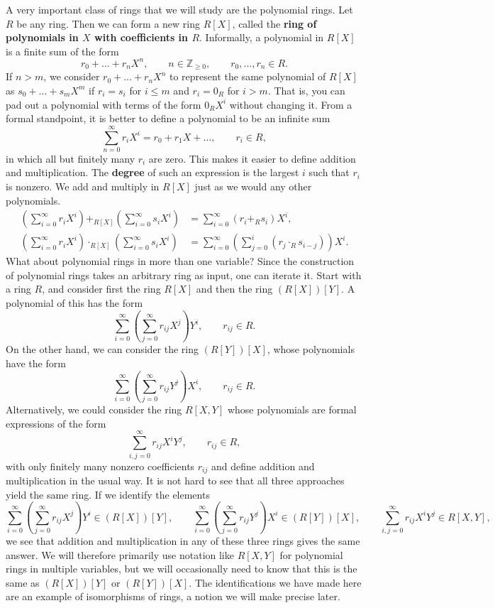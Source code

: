 \documentclass{article}
\newcommand{\Z}{\mathbb{Z}}
\newcommand{\rb}[1]{\left( #1 \right)}
\renewcommand{\sb}[1]{\left[ #1 \right]}
\theoremstyle{definition}\newtheorem{definition}{Definition}[subsection]
\theoremstyle{definition}\newtheorem{remark}[definition]{Remark}
\theoremstyle{definition}\newtheorem*{example}{Example}
\theoremstyle{definition}\newtheorem*{note}{Note}
\begin{document}
A very important class of rings that we will study are the polynomial rings. Let $ R $ be any ring. Then we can form a new ring $ R\sb{X} $, called the \textbf{ring of polynomials in $ X $ with coefficients in $ R $}. Informally, a polynomial in $ R\sb{X} $ is a finite sum of the form
$$ r_0 + \dots + r_nX^n, \qquad n \in \Z_{\ge 0}, \qquad r_0, \dots, r_n \in R. $$
If $ n > m $, we consider $ r_0 + \dots + r_nX^n $ to represent the same polynomial of $ R\sb{X} $ as $ s_0 + \dots + s_mX^m $ if $ r_i = s_i $ for $ i \le m $ and $ r_i = 0_R $ for $ i > m $. That is, you can pad out a polynomial with terms of the form $ 0_RX^i $ without changing it. From a formal standpoint, it is better to define a polynomial to be an infinite sum
$$ \sum_{n = 0}^\infty r_iX^i = r_0 + r_1X + \dots, \qquad r_i \in R, $$
in which all but finitely many $ r_i $ are zero. This makes it easier to define addition and multiplication. The \textbf{degree} of such an expression is the largest $ i $ such that $ r_i $ is nonzero. We add and multiply in $ R\sb{X} $ just as we would any other polynomials.
\begin{align*}
\rb{\sum_{i = 0}^\infty r_iX^i} +_{R\sb{X}} \rb{\sum_{i = 0}^\infty s_iX^i} & = \sum_{i = 0}^\infty \rb{r_i +_R s_i} X^i, \\
\rb{\sum_{i = 0}^\infty r_iX^i} \cdot_{R\sb{X}} \rb{\sum_{i = 0}^\infty s_iX^i} & = \sum_{i = 0}^\infty \rb{\sum_{j = 0}^i \rb{r_j \cdot_R s_{i - j}}} X^i.
\end{align*}
What about polynomial rings in more than one variable? Since the construction of polynomial rings takes an arbitrary ring as input, one can iterate it. Start with a ring $ R $, and consider first the ring $ R\sb{X} $ and then the ring $ \rb{R\sb{X}}\sb{Y} $. A polynomial of this has the form
$$ \sum_{i = 0}^\infty \rb{\sum_{j = 0}^\infty r_{ij}X^j}Y^i, \qquad r_{ij} \in R. $$
On the other hand, we can consider the ring $ \rb{R\sb{Y}}\sb{X} $, whose polynomials have the form
$$ \sum_{i = 0}^\infty \rb{\sum_{j = 0}^\infty r_{ij}Y^j}X^i, \qquad r_{ij} \in R. $$
Alternatively, we could consider the ring $ R\sb{X, Y} $ whose polynomials are formal expressions of the form
$$ \sum_{i, j = 0}^\infty r_{ij}X^iY^j, \qquad r_{ij} \in R, $$
with only finitely many nonzero coefficients $ r_{ij} $ and define addition and multiplication in the usual way. It is not hard to see that all three approaches yield the same ring. If we identify the elements
$$ \sum_{i = 0}^\infty \rb{\sum_{j = 0}^\infty r_{ij}X^j}Y^i \in \rb{R\sb{X}}\sb{Y}, \qquad \sum_{i = 0}^\infty \rb{\sum_{j = 0}^\infty r_{ij}Y^j}X^i \in \rb{R\sb{Y}}\sb{X}, \qquad \sum_{i, j = 0}^\infty r_{ij}X^iY^j \in R\sb{X, Y}, $$
we see that addition and multiplication in any of these three rings gives the same answer. We will therefore primarily use notation like $ R\sb{X, Y} $ for polynomial rings in multiple variables, but we will occasionally need to know that this is the same as $ \rb{R\sb{X}}\sb{Y} $ or $ \rb{R\sb{Y}}\sb{X} $. The identifications we have made here are an example of isomorphisms of rings, a notion we will make precise later.
\end{document}
